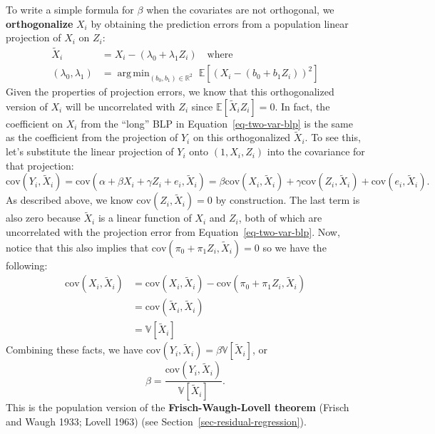 \documentclass[
  13pt,
  letterpaper,
  DIV=11,
  numbers=noendperiod]{scrreprt}
\newcommand{\E}{\mathbb{E}}
\newcommand{\V}{\mathbb{V}}
\newcommand{\cov}{\text{cov}}
\DeclareMathOperator*{\argmin}{arg\,min}
\theoremstyle{plain}
\theoremstyle{plain}
\theoremstyle{definition}
\theoremstyle{definition}
\theoremstyle{remark}
\begin{document}
To write a simple formula for \(\beta\) when the covariates are not
orthogonal, we \textbf{orthogonalize} \(X_i\) by obtaining the
prediction errors from a population linear projection of \(X_i\) on
\(Z_i\): \[ 
\begin{aligned}
\widetilde{X}_{i} &= X_{i} - (\lambda_{0} + \lambda_{1}Z_{i}) \quad\text{where}\quad \\ 
(\lambda_{0}, \lambda_{1}) &= \argmin_{(b_{0},b_{1}) \in \mathbb{R}^{2}} \; \E[(X_{i} - (b_{0} + b_{1}Z_{i}))^{2}]
\end{aligned}
\] Given the properties of projection errors, we know that this
orthogonalized version of \(X_{i}\) will be uncorrelated with \(Z_{i}\)
since \(\E[\widetilde{X}_{i}Z_{i}] = 0\). In fact, the coefficient on
\(X_i\) from the ``long'' BLP in Equation~\ref{eq-two-var-blp} is the
same as the coefficient from the projection of \(Y_i\) on this
orthogonalized \(\widetilde{X}_i\). To see this, let's substitute the
linear projection of \(Y_i\) onto \((1, X_i, Z_i)\) into the covariance
for that projection: \[
\cov(Y_{i}, \widetilde{X}_{i}) = \cov(\alpha + \beta X_i + \gamma Z_i + e_i, \widetilde{X}_i) = \beta\cov(X_i, \widetilde{X}_i) + \gamma\cov(Z_i, \widetilde{X}_i) + \cov(e_i, \widetilde{X}_i).
\] As described above, we know \(\cov(Z_i, \widetilde{X}_i) = 0\) by
construction. The last term is also zero because \(\widetilde{X}_i\) is
a linear function of \(X_i\) and \(Z_i\), both of which are uncorrelated
with the projection error from Equation~\ref{eq-two-var-blp}. Now,
notice that this also implies that
\(\cov(\pi_0 + \pi_1 Z_i, \widetilde{X}_i) = 0\) so we have the
following: \[
\begin{aligned}
\cov(X_i, \widetilde{X}_i) &= \cov(X_i, \widetilde{X}_i) - \cov(\pi_0 + \pi_1 Z_i, \widetilde{X}_i) \\ &= \cov(\widetilde{X}_i, \widetilde{X}_i) \\&= \V[\widetilde{X}_i]
\end{aligned}
\] Combining these facts, we have
\(\cov(Y_{i}, \widetilde{X}_{i}) = \beta \V[\widetilde{X}_i]\), or \[ 
\beta = \frac{\cov(Y_{i}, \widetilde{X}_{i})}{\V[\widetilde{X}_{i}]}.
\] This is the population version of the \textbf{Frisch-Waugh-Lovell
theorem} (Frisch and Waugh 1933; Lovell 1963) (see
Section~\ref{sec-residual-regression}).
\end{document}
